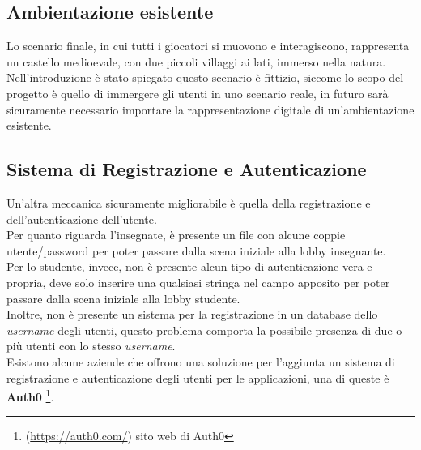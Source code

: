 \subsection{Ambientazione esistente}
Lo scenario finale, in cui tutti i giocatori si muovono e interagiscono, rappresenta un castello medioevale, con due piccoli villaggi ai lati, immerso nella natura.
\\Nell'introduzione è stato spiegato questo scenario è fittizio, siccome lo scopo del progetto è quello di immergere gli utenti in uno scenario reale, in futuro sarà sicuramente necessario importare la rappresentazione digitale di un'ambientazione esistente.
\subsection{Sistema di Registrazione e Autenticazione}
Un'altra meccanica sicuramente migliorabile è quella della registrazione e dell'autenticazione dell'utente.
\\Per quanto riguarda l'insegnate, è presente un file con alcune coppie utente/password per poter passare dalla scena iniziale alla lobby insegnante.
\\Per lo studente, invece, non è presente alcun tipo di autenticazione vera e propria, deve solo inserire una qualsiasi stringa nel campo apposito per poter passare dalla scena iniziale alla lobby studente.
\\Inoltre, non è presente un sistema per la registrazione in un database dello \textit{username} degli utenti, questo problema comporta la possibile presenza di due o più utenti con lo stesso \textit{username}.
\\Esistono alcune aziende che offrono una soluzione per l'aggiunta un sistema di registrazione e autenticazione degli utenti per le applicazioni, una di queste è \textbf{Auth0} \footnote{(\url{https://auth0.com/}) sito web di Auth0}.